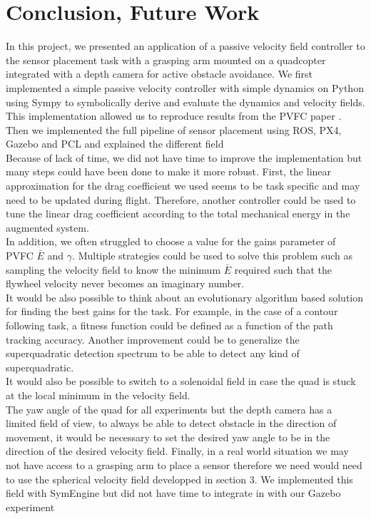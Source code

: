 \section{Conclusion, Future Work}
In this project, we presented an application of a passive velocity field controller to the sensor placement task with a grasping arm mounted on a quadcopter integrated with a depth camera for active obstacle avoidance. 
We first implemented a simple passive velocity controller with simple dynamics on Python using Sympy to symbolically derive and evaluate the dynamics and velocity fields. 
This implementation allowed us to reproduce results from the PVFC paper \cite{li1999passive}.
Then we implemented the full pipeline of sensor placement using ROS, PX4, Gazebo and PCL and explained the different field\\

Because of lack of time, we did not have time to improve the implementation but many steps could have been done to make it more robust.
First, the linear approximation for the drag coefficient we used seems to be task specific and may need to be updated during flight. Therefore, another controller could be used to tune the linear drag coefficient 
according to the total mechanical energy in the augmented system.\\
In addition, we often struggled to choose a value for the gains parameter of PVFC $\bar{E}$ and $\gamma$. Multiple strategies could be used to solve this problem such as sampling the velocity field to know the minimum $\bar{E}$ required 
such that the flywheel velocity never becomes an imaginary number. \\
It would be also possible to think about an evolutionary algorithm based solution for finding the best gains for the task. For example, in the case of a contour following task, a fitness function could be defined as a function of the path tracking accuracy.
Another improvement could be to generalize the superquadratic detection spectrum to be able to detect any kind of superquadratic.\\
It would also be possible to switch to a solenoidal field in case the quad is stuck at the local minimum in the velocity field.\\
The yaw angle of the quad for all experiments but the depth camera has a limited field of view, to always be able to detect obstacle in the direction of movement, it would be necessary to set the desired yaw angle to be in the direction of the desired velocity field.
Finally, in a real world situation we may not have access to a grasping arm to place a sensor therefore we need would need to use the spherical velocity field developped in section 3. We implemented this field with SymEngine but did not have time to integrate in with our Gazebo experiment 

